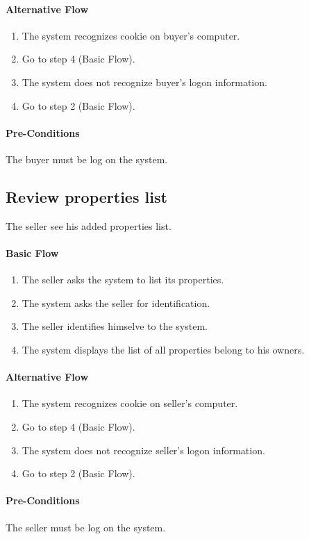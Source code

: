 \documentclass[a4paper,12pt]{article}
\begin{document}
\paragraph{Alternative Flow}
\begin{enumerate}
\item The system recognizes cookie on buyer's computer. 
\item Go to step 4 (Basic Flow).
\item The system does not recognize buyer's logon information.
\item Go to step 2 (Basic Flow).
\end{enumerate}
\paragraph{Pre-Conditions}
The buyer must be log on the system.

\subsection{Review properties list}
The seller see his added properties list.
\paragraph{Basic Flow}
\begin{enumerate}
\item The seller asks the system to list its properties.
\item The system asks the seller for identification.
\item The seller identifies himselve to the system.
\item The system displays the list of all properties belong to his owners.
\end{enumerate}
\paragraph{Alternative Flow}
\begin{enumerate}
\item The system recognizes cookie on seller's computer. 
\item Go to step 4 (Basic Flow).
\item The system does not recognize seller's logon information.
\item Go to step 2 (Basic Flow).
\end{enumerate}
\paragraph{Pre-Conditions}
The seller must be log on the system.
\end{document}
